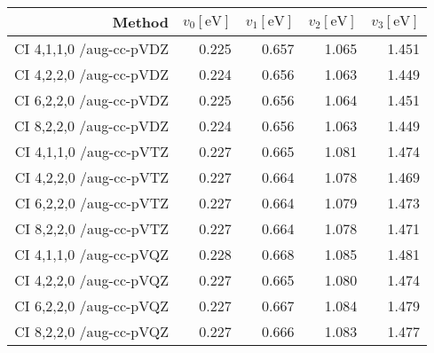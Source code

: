 \begin{tabular}{rrrrr}
\toprule
Method & $v_0 [\mathrm{eV}]$ & $v_1 [\mathrm{eV}]$ & $v_2 [\mathrm{eV}]$ & $v_3[\mathrm{eV}]$ \\ \midrule
CI 4,1,1,0 /aug-cc-pVDZ & 0.225 & 0.657 & 1.065 & 1.451\\
CI 4,2,2,0 /aug-cc-pVDZ & 0.224 & 0.656 & 1.063 & 1.449\\
CI 6,2,2,0 /aug-cc-pVDZ & 0.225 & 0.656 & 1.064 & 1.451\\
CI 8,2,2,0 /aug-cc-pVDZ & 0.224 & 0.656 & 1.063 & 1.449\\
CI 4,1,1,0 /aug-cc-pVTZ & 0.227 & 0.665 & 1.081 & 1.474\\
CI 4,2,2,0 /aug-cc-pVTZ & 0.227 & 0.664 & 1.078 & 1.469\\
CI 6,2,2,0 /aug-cc-pVTZ & 0.227 & 0.664 & 1.079 & 1.473\\
CI 8,2,2,0 /aug-cc-pVTZ & 0.227 & 0.664 & 1.078 & 1.471\\
CI 4,1,1,0 /aug-cc-pVQZ & 0.228 & 0.668 & 1.085 & 1.481\\
CI 4,2,2,0 /aug-cc-pVQZ & 0.227 & 0.665 & 1.080 & 1.474\\
CI 6,2,2,0 /aug-cc-pVQZ & 0.227 & 0.667 & 1.084 & 1.479\\
CI 8,2,2,0 /aug-cc-pVQZ & 0.227 & 0.666 & 1.083 & 1.477\\
\bottomrule
\end{tabular}
    
